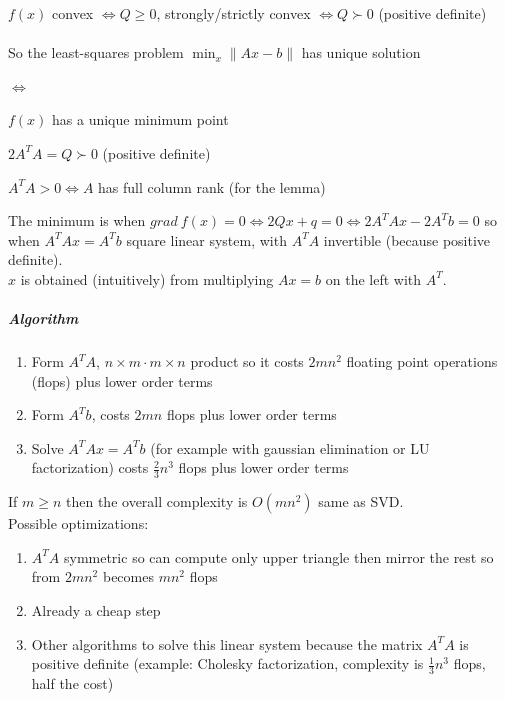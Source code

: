 \documentclass[10pt]{report}
\begin{document}
$f(x)$ convex $\Leftrightarrow Q \geq 0$, strongly/strictly convex $\Leftrightarrow Q \succ 0$ (positive definite)\\\\
So the least-squares problem $\min_x \|Ax-b\|$ has unique solution
\begin{list}{$\Leftrightarrow$}{}
	\item $f(x)$ has a unique minimum point
	\item $2A^TA = Q \succ 0$ (positive definite)
	\item $A^TA > 0 \Leftrightarrow A$ has full column rank (for the lemma)
\end{list}
The minimum is when $grad\:f(x) = 0 \Leftrightarrow 2Qx + q = 0 \Leftrightarrow 2A^TAx - 2A^Tb = 0$ so when $A^TAx = A^Tb$ square linear system, with $A^TA$ invertible (because positive definite).\\
$x$ is obtained (intuitively) from multiplying $Ax=b$ on the left with $A^T$.
\subparagraph{Algorithm}
\begin{enumerate}
	\item Form $A^TA$, $n\times m\cdot m\times n$ product so it costs $2mn^2$ floating point operations (flops) plus lower order terms
	\item Form $A^Tb$, costs $2mn$ flops plus lower order terms
	\item Solve $A^TAx = A^Tb$ (for example with gaussian elimination or LU factorization) costs $\frac{2}{3}n^3$ flops plus lower order terms
\end{enumerate}
If $m \geq n$ then the overall complexity is $O(mn^2)$ same as SVD.\\
Possible optimizations:
\begin{enumerate}
	\item $A^TA$ symmetric so can compute only upper triangle then mirror the rest so from $2mn^2$ becomes $mn^2$ flops
	\item Already a cheap step
	\item Other algorithms to solve this linear system because the matrix $A^TA$ is positive definite (example: Cholesky factorization, complexity is $\frac{1}{3}n^3$ flops, half the cost)
\end{enumerate}
\end{document}
